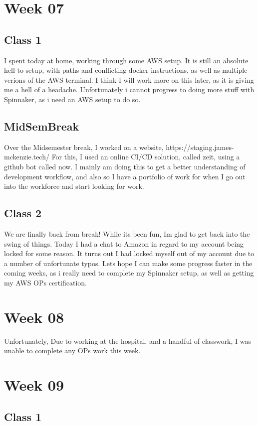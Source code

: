 \documentclass{article}
\begin{document}
\section{Week 07}
\subsection{Class 1}
I spent today at home, working through some AWS setup. It is still an absolute hell to setup, with paths and conflicting docker instructions, 
as well as multiple verions of the AWS terminal. I think I will work more on this later, as it is giving me a hell of a headache. Unfortunately
i cannot progress to doing more stuff with Spinnaker, as i need an AWS setup to do so.
\subsection*{MidSemBreak}
Over the Midsemester break, I worked on a website, https://staging.james-mckenzie.tech/ For this, I used an online CI/CD solution,
called zeit, using a github bot called now. I mainly am doing this to get a better understanding of development workflow, and also so I
have a portfolio of work for when I go out into the workforce and start looking for work.
\subsection{Class 2}
We are finally back from break! While its been fun, Im glad to get back into the swing of things. Today I had a chat to
Amazon in regard to my account being locked for some reason. It turns out I had locked myself out of my account due to a number
of unfortunate typos. Lets hope I can make some progress faster in the coming weeks, as i really need to complete my Spinnaker setup,
as well as getting my AWS OPs certification. 

\section{Week 08}
Unfortunately, Due to working at the hospital, and a handful of classwork, I was unable to complete any OPs work this week. 
\section{Week 09}
\subsection {Class 1}
\end{document}
